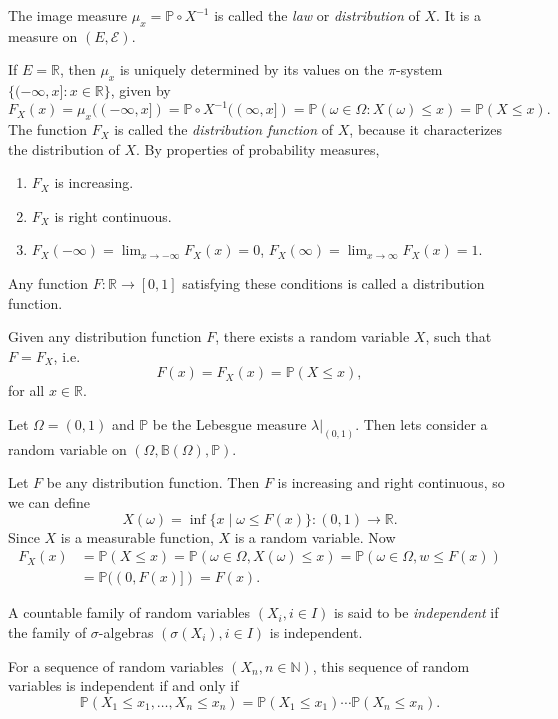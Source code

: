 \documentclass[12pt]{article}
\begin{document}
The image measure $\mu_x = \mathbb{P} \circ X^{-1}$ is called the \emph{law} or \emph{distribution} of $X$. It is a measure on $(E, \mathcal{E})$.

If $E = \mathbb{R}$, then $\mu_x$ is uniquely determined by its values on the $\pi$-system $\{(-\infty, x] : x \in \mathbb{R}\}$, given by
\[
	F_X(x) = \mu_x ((-\infty, x]) = \mathbb{P} \circ X^{-1}((\infty, x]) = \mathbb{P}(\omega \in \Omega : X(\omega) \leq x) = \mathbb{P}(X \leq x).
\]
The function $F_X$ is called the \emph{distribution function} of $X$, because it characterizes the distribution of $X$. By properties of probability measures,
\begin{enumerate}
	\item $F_X$ is increasing.
	\item $F_X$ is right continuous.
	\item $F_X(-\infty) = \lim_{x \to -\infty} F_X(x) = 0$, $F_X(\infty) = \lim_{x \to \infty} F_X(x) = 1$.
\end{enumerate}
Any function $F : \mathbb{R} \to [0, 1]$ satisfying these conditions is called a distribution function.

Given any distribution function $F$, there exists a random variable $X$, such that $F = F_X$, i.e.
\[
F(x) = F_X(x) = \mathbb{P}(X \leq x),
\]
for all $x \in \mathbb{R}$.

\begin{proofbox}
	Let $\Omega = (0, 1)$ and $\mathbb{P}$ be the Lebesgue measure $\lambda|_{(0,1)}$. Then lets consider a random variable on $(\Omega, \mathbb{B}(\Omega), \mathbb{P})$.

	Let $F$ be any distribution function. Then $F$ is increasing and right continuous, so we can define
	\[
		X(\omega) = \inf \{ x \mid \omega \leq F(x)\} : (0,1) \to \mathbb{R}.
	\]
	Since $X$ is a measurable function, $X$ is a random variable. Now
	\begin{align*}
		F_X(x) &= \mathbb{P}(X \leq x) = \mathbb{P}(\omega \in \Omega, X(\omega) \leq x) = \mathbb{P}(\omega \in \Omega, w \leq F(x)) \\
		       &= \mathbb{P}((0,F(x)]) = F(x).
	\end{align*}
\end{proofbox}

\begin{definition}
	A countable family of random variables $(X_i, i \in I)$ is said to be \emph{independent} if the family of $\sigma$-algebras $(\sigma(X_i), i \in I)$ is independent.

	For a sequence of random variables $(X_n, n \in \mathbb{N})$, this sequence of random variables is independent if and only if
	\[
	\mathbb{P}(X_1 \leq x_1, \ldots, X_n \leq x_n) = \mathbb{P}(X_1 \leq x_1) \cdots \mathbb{P}(X_n \leq x_n).
	\]
\end{definition}
\end{document}
